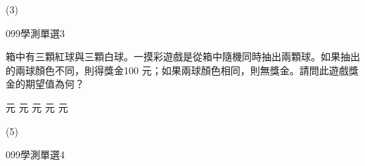 \begin{QUESTIONS}
\begin{QUESTION}
\begin{QFROMS}
        \end{QFROMS}
        \begin{QTAGS}\end{QTAGS}
        \begin{QANS}
            (3)
        \end{QANS}
        \begin{QSOLLIST}
        \end{QSOLLIST}
        \begin{QEMPTYSPACE}
        \end{QEMPTYSPACE}
    \end{QUESTION}
    \begin{QUESTION}
        \begin{ExamInfo}{099}{學測}{單選}{3}
        \end{ExamInfo}
        \begin{ExamAnsRateInfo}{55}{84}{62}{19}
        \end{ExamAnsRateInfo}
        \begin{QBODY}
			箱中有三顆紅球與三顆白球。一摸彩遊戲是從箱中隨機同時抽出兩顆球。如果抽出的兩球顏色不同，則得獎金100 元；如果兩球顏色相同，則無獎金。請問此遊戲獎金的期望值為何？
			\begin{QOPS} 
				 元 
				 元 
				 元 
				 元 
				 元
			\end{QOPS}
        \end{QBODY}
        \begin{QFROMS}
        \end{QFROMS}
        \begin{QTAGS}\end{QTAGS}
        \begin{QANS}
            (5)
        \end{QANS}
        \begin{QSOLLIST}
        \end{QSOLLIST}
        \begin{QEMPTYSPACE}
        \end{QEMPTYSPACE}
    \end{QUESTION}
    \begin{QUESTION}
        \begin{ExamInfo}{099}{學測}{單選}{4}
        \end{ExamInfo}
        \begin{ExamAnsRateInfo}{33}{61}{25}{13}
        \end{ExamAnsRateInfo}
        \begin{QBODY}

\end{QBODY}
\end{QUESTION}
\end{QUESTIONS}
